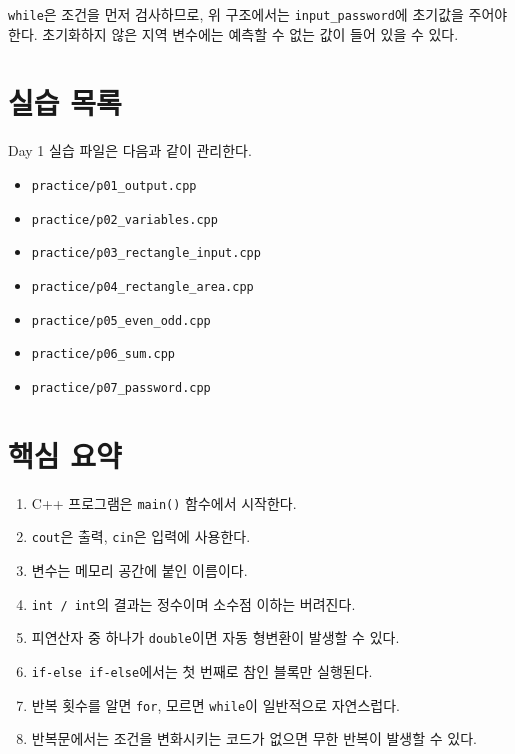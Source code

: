 \documentclass[11pt,a4paper]{article}
\begin{document}
\texttt{while}은 조건을 먼저 검사하므로, 위 구조에서는
\texttt{input\_password}에 초기값을 주어야 한다.
초기화하지 않은 지역 변수에는 예측할 수 없는 값이 들어 있을 수 있다.

\section{실습 목록}

\begin{practicebox}
Day 1 실습 파일은 다음과 같이 관리한다.
\begin{itemize}[leftmargin=1.5em]
    \item \texttt{practice/p01\_output.cpp}
    \item \texttt{practice/p02\_variables.cpp}
    \item \texttt{practice/p03\_rectangle\_input.cpp}
    \item \texttt{practice/p04\_rectangle\_area.cpp}
    \item \texttt{practice/p05\_even\_odd.cpp}
    \item \texttt{practice/p06\_sum.cpp}
    \item \texttt{practice/p07\_password.cpp}
\end{itemize}
\end{practicebox}

\section{핵심 요약}

\begin{enumerate}
    \item C++ 프로그램은 \texttt{main()} 함수에서 시작한다.
    \item \texttt{cout}은 출력, \texttt{cin}은 입력에 사용한다.
    \item 변수는 메모리 공간에 붙인 이름이다.
    \item \texttt{int / int}의 결과는 정수이며 소수점 이하는 버려진다.
    \item 피연산자 중 하나가 \texttt{double}이면 자동 형변환이 발생할 수 있다.
    \item \texttt{if-else if-else}에서는 첫 번째로 참인 블록만 실행된다.
    \item 반복 횟수를 알면 \texttt{for}, 모르면 \texttt{while}이 일반적으로 자연스럽다.
    \item 반복문에서는 조건을 변화시키는 코드가 없으면 무한 반복이 발생할 수 있다.
\end{enumerate}
\end{document}
